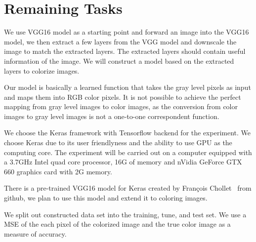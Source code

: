 \documentclass[12pt]{article}
\begin{document}
\section{Remaining Tasks}
We use VGG16 model as a starting point and forward an image into the VGG16 model, we then extract a few layers from the VGG model and downscale the image to match the extracted layers. The extracted layers should contain useful information of the image. We will construct a model based on the extracted layers to colorize images.  


Our model is basically a learned function that takes the gray level pixels as input and maps them into RGB color pixels. It is not possible to achieve the perfect mapping from gray level images to color images, as the conversion from color images to gray level images is not a one-to-one correspondent function. 


We choose the Keras framework with Tensorflow backend for the experiment. We choose Keras due to its user friendlyness and the ability to use GPU as the computing core. The experiment will be carried out on a computer equipped with a 3.7GHz Intel quad core processor, 16G of memory and nVidia GeForce GTX 660 graphics card with 2G memory.  


There is a pre-trained VGG16 model for Keras created by François Chollet~\cite{VGG16TRAINED} from github, we plan to use this model and extend it to coloring images. 


We split out constructed data set into the training, tune, and test set. We use a MSE of the each pixel of the colorized image and the true color image as a measure of accuracy. 





\end{document}
